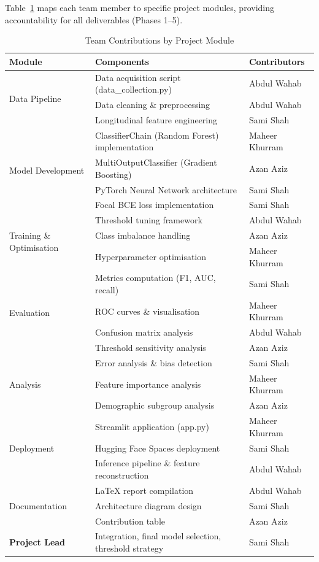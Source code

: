 \documentclass[12pt]{article}
\begin{document}
Table~\ref{tab:contributions} maps each team member to specific project modules,
providing accountability for all deliverables (Phases 1--5).

\begin{table}[H]
\centering
\caption{Team Contributions by Project Module}
\label{tab:contributions}
\begin{tabular}{p{3.8cm} p{7.2cm} p{3cm}}
\toprule
\textbf{Module} & \textbf{Components} & \textbf{Contributors} \\
\midrule
\multirow{3}{*}{Data Pipeline} & Data acquisition script (data\_collection.py) & Abdul Wahab \\
& Data cleaning \& preprocessing & Abdul Wahab \\
& Longitudinal feature engineering & Sami Shah \\
\midrule
\multirow{4}{*}{Model Development} & ClassifierChain (Random Forest) implementation & Maheer Khurram \\
& MultiOutputClassifier (Gradient Boosting) & Azan Aziz \\
& PyTorch Neural Network architecture & Sami Shah \\
& Focal BCE loss implementation & Sami Shah \\
\midrule
\multirow{3}{*}{Training \& Optimisation} & Threshold tuning framework & Abdul Wahab \\
& Class imbalance handling & Azan Aziz \\
& Hyperparameter optimisation & Maheer Khurram \\
\midrule
\multirow{4}{*}{Evaluation} & Metrics computation (F1, AUC, recall) & Sami Shah \\
& ROC curves \& visualisation & Maheer Khurram \\
& Confusion matrix analysis & Abdul Wahab \\
& Threshold sensitivity analysis & Azan Aziz \\
\midrule
\multirow{3}{*}{Analysis} & Error analysis \& bias detection & Sami Shah \\
& Feature importance analysis & Maheer Khurram \\
& Demographic subgroup analysis & Azan Aziz \\
\midrule
\multirow{3}{*}{Deployment} & Streamlit application (app.py) & Maheer Khurram \\
& Hugging Face Spaces deployment & Sami Shah \\
& Inference pipeline \& feature reconstruction & Abdul Wahab \\
\midrule
\multirow{3}{*}{Documentation} & LaTeX report compilation & Abdul Wahab \\
& Architecture diagram design & Sami Shah \\
& Contribution table & Azan Aziz \\
\midrule
\textbf{Project Lead} & Integration, final model selection, threshold strategy & Sami Shah \\
\bottomrule
\end{tabular}
\end{table}
\end{document}
